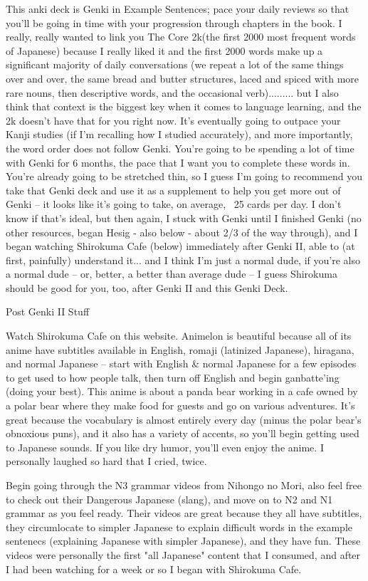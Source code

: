 This anki deck is Genki in Example Sentences; pace your daily reviews so that you'll be going in time with your progression through chapters in the book. I really, really wanted to link you The Core 2k(the first 2000 most frequent words of Japanese) because I really liked it and the first 2000 words make up a significant majority of daily conversations (we repeat a lot of the same things over and over, the same bread and butter structures, laced and spiced with more rare nouns, then descriptive words, and the occasional verb)......... but I also think that context is the biggest key when it comes to language learning, and the 2k doesn't have that for you right now. It's eventually going to outpace your Kanji studies (if I'm recalling how I studied accurately), and more importantly, the word order does not follow Genki. You're going to be spending a lot of time with Genki for 6 months, the pace that I want you to complete these words in. You're already going to be stretched thin, so I guess I'm going to recommend you take that Genki deck and use it as a supplement to help you get more out of Genki -- it looks like it's going to take, on average, ~25 cards per day. I don't know if that's ideal, but then again, I stuck with Genki until I finished Genki (no other resources, began Hesig - also below - about 2/3 of the way through), and I began watching Shirokuma Cafe (below) immediately after Genki II, able to (at first, painfully) understand it... and I think I'm just a normal dude, if you're also a normal dude -- or, better, a better than average dude -- I guess Shirokuma should be good for you, too, after Genki II and this Genki Deck.

Post Genki II Stuff

Watch Shirokuma Cafe on this website.
Animelon is beautiful because all of its anime have subtitles available in English, romaji (latinized Japanese), hiragana, and normal Japanese -- start with English & normal Japanese for a few episodes to get used to how people talk, then turn off English and begin ganbatte'ing (doing your best). This anime is about a panda bear working in a cafe owned by a polar bear where they make food for guests and go on various adventures. It's great because the vocabulary is almost entirely every day (minus the polar bear's obnoxious puns), and it also has a variety of accents, so you'll begin getting used to Japanese sounds. If you like dry humor, you'll even enjoy the anime. I personally laughed so hard that I cried, twice.

Begin going through the N3 grammar videos from Nihongo no Mori, also feel free to check out their Dangerous Japanese (slang), and move on to N2 and N1 grammar as you feel ready. Their videos are great because they all have subtitles, they circumlocate to simpler Japanese to explain difficult words in the example sentenecs (explaining Japanese with simpler Japanese), and they have fun. These videos were personally the first "all Japanese" content that I consumed, and after I had been watching for a week or so I began with Shirokuma Cafe.

